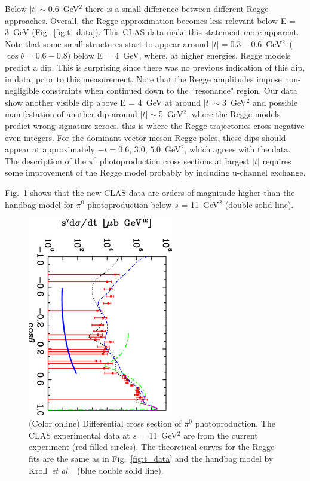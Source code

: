 \documentclass[aps,prc,twocolumn,floatfix,showpacs,preprintnumbers,amsmath,amssymb,superscriptaddress,linenumbers]{revtex4-1}
\begin{document}
Below $|t|\sim$0.6~GeV$^2$ there is a small difference between 
different Regge approaches.  Overall, the Regge approximation 
becomes less relevant below E = 3~GeV (Fig.~\ref{fig:t_data}).  
This CLAS data make this statement more apparent.  Note that 
some small structures start to appear around $|t| = 
0.3-0.6$~GeV$^2$~($\cos\theta = 0.6-0.8$) below E = 4~GeV, where, at higher energies, Regge models predict a dip.  
This is surprising since there was no previous 
indication of this dip, in data, prior to this measurement. 
Note that the Regge amplitudes impose non-negligible constraints when continued down to the 
``resonance" region.
Our data show another visible dip above E = 4~GeV at around $|t|\sim$3~GeV$^2$ and possible manifestation of another dip around $|t|\sim$5~GeV$^2$, where the Regge models~\cite{Goldstein:1973xn,
Laget:2005be,Donnachie:2015jaa} predict wrong signature zeroes, 
this is where the Regge trajectories cross negative even integers. 
For the dominant vector meson Regge poles, these dips should appear 
at approximately $-t=0.6, \, 3.0, \, 5.0$~GeV$^2$,  which agrees 
with the data.  The description of the $\pi^0$ photoproduction 
cross sections at largest $|t|$ requires some improvement of the 
Regge model probably by including u-channel exchange.

Fig.~\ref{fig:kroll} shows that the new CLAS data are orders of 
magnitude higher than the handbag model for $\pi^0$ 
photoproduction below $s$ = 11~GeV$^2$ (double 
solid line).
\begin{figure}
\centerline{
        \includegraphics[width=2.5in, angle=90]{kroll.eps}}

        \caption {(Color online) Differential cross section 
	of $\pi^0$ photoproduction. The CLAS experimental data 
	at $s$ = 11~GeV$^2$ are from the current experiment (red 
	filled circles). The theoretical curves for the Regge 
	fits are the same as in Fig.~\protect\ref{fig:t_data} 
	and the handbag model by Kroll~\textit{et 
	al.}~\protect\cite{Huang:2000kd} (blue double solid 
	line).} \label{fig:kroll}
\end{figure}
\end{document}
